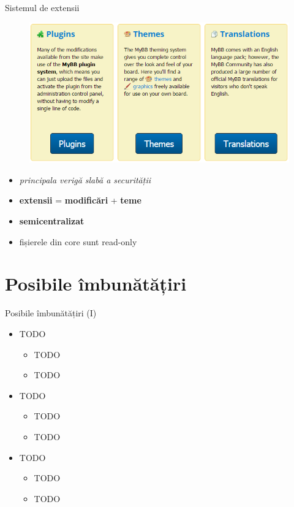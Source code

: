 \documentclass[9pt]{beamer}
\begin{document}
\begin{frame}{Sistemul de extensii}
    \begin{figure}
        \includegraphics[scale=0.4]{figures/screen5}
    \end{figure}

    \begin{itemize}
		\vskip10pt
		\item \textit{principala verigă slabă a securității}
		\vskip10pt
		\item \textbf{extensii} = \textbf{modificări} + \textbf{teme}
		\vskip10pt
		\item \textbf{semicentralizat}
		\vskip10pt
		\item fișierele din core sunt read-only
	\end{itemize}

\end{frame}

\section[]{Posibile îmbunătățiri}

\begin{frame}{Posibile îmbunătățiri (I)}
\begin{itemize}
    \item \Large{TODO}
    \begin{itemize}
		\vskip5pt
		\item TODO
		\vskip5pt
		\item TODO
	\end{itemize}
	\vskip10pt
	\item \Large{TODO}
    \begin{itemize}
		\vskip5pt
		\item TODO
		\vskip5pt
		\item TODO
	\end{itemize}
	\item \Large{TODO}
    \begin{itemize}
		\vskip5pt
		\item TODO
		\vskip5pt
		\item TODO
	\end{itemize}
\end{itemize}
\end{frame}
\end{document}

